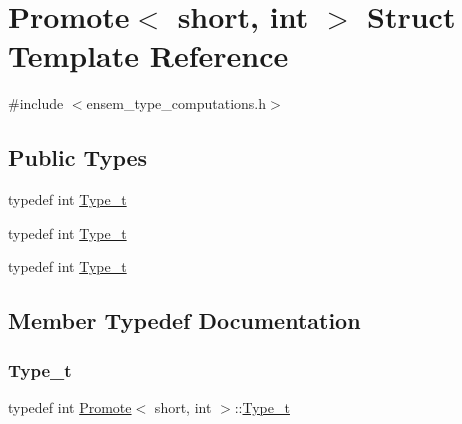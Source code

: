 \hypertarget{structPromote_3_01short_00_01int_01_4}{}\section{Promote$<$ short, int $>$ Struct Template Reference}
\label{structPromote_3_01short_00_01int_01_4}


{\ttfamily \#include $<$ensem\+\_\+type\+\_\+computations.\+h$>$}

\subsection*{Public Types}
\begin{DoxyCompactItemize}
\item 
typedef int \mbox{\hyperlink{structPromote_3_01short_00_01int_01_4_a4c576886bac5096bb59339397d07ab38}{Type\+\_\+t}}
\item 
typedef int \mbox{\hyperlink{structPromote_3_01short_00_01int_01_4_a4c576886bac5096bb59339397d07ab38}{Type\+\_\+t}}
\item 
typedef int \mbox{\hyperlink{structPromote_3_01short_00_01int_01_4_a4c576886bac5096bb59339397d07ab38}{Type\+\_\+t}}
\end{DoxyCompactItemize}


\subsection{Member Typedef Documentation}
\mbox{\label{structPromote_3_01short_00_01int_01_4_a4c576886bac5096bb59339397d07ab38}} 
\subsubsection{\texorpdfstring{Type\_t}{Type\_t}\hspace{0.1cm}{\footnotesize\ttfamily [1/3]}}
{\footnotesize\ttfamily typedef int \mbox{\hyperlink{structPromote}{Promote}}$<$ short, int $>$\+::\mbox{\hyperlink{structPromote_3_01short_00_01int_01_4_a4c576886bac5096bb59339397d07ab38}{Type\+\_\+t}}}

\mbox{\label{structPromote_3_01short_00_01int_01_4_a4c576886bac5096bb59339397d07ab38}} 
